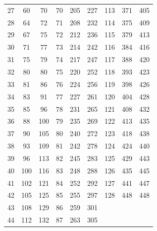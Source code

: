 \begin{table}[H]
\begin{tabular}{ccc|ccc|ccc}
27 & 60 & 70 & 70 & 205 & 227 & 113 & 371 & 405 \\
28 & 64 & 72 & 71 & 208 & 232 & 114 & 375 & 409 \\
29 & 67 & 75 & 72 & 212 & 236 & 115 & 379 & 413 \\
30 & 71 & 77 & 73 & 214 & 242 & 116 & 384 & 416 \\
31 & 75 & 79 & 74 & 217 & 247 & 117 & 388 & 420 \\
32 & 80 & 80 & 75 & 220 & 252 & 118 & 393 & 423 \\
33 & 81 & 86 & 76 & 224 & 256 & 119 & 398 & 426 \\
34 & 83 & 91 & 77 & 227 & 261 & 120 & 404 & 428 \\
35 & 85 & 96 & 78 & 231 & 265 & 121 & 408 & 432 \\
36 & 88 & 100 & 79 & 235 & 269 & 122 & 413 & 435 \\
37 & 90 & 105 & 80 & 240 & 272 & 123 & 418 & 438 \\
38 & 93 & 109 & 81 & 242 & 278 & 124 & 424 & 440 \\
39 & 96 & 113 & 82 & 245 & 283 & 125 & 429 & 443 \\
40 & 100 & 116 & 83 & 248 & 288 & 126 & 435 & 445 \\
41 & 102 & 121 & 84 & 252 & 292 & 127 & 441 & 447 \\
42 & 105 & 125 & 85 & 255 & 297 & 128 & 448 & 448 \\
43 & 108 & 129 & 86 & 259 & 301 &  &  &  \\
44 & 112 & 132 & 87 & 263 & 305 &  &  &  \\
\bottomrule
\end{tabular}
\end{table}
